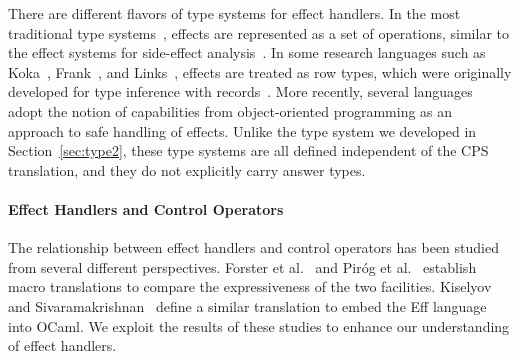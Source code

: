 There are different flavors of type systems for effect handlers.
In the most traditional type systems~\cite{bauer-effsys,kammar-handler},
effects are represented as a set of operations, similar to the effect
systems for side-effect analysis~\cite{nielson-effsys}.
In some research languages such as Koka~\cite{leijen-koka},
Frank~\cite{lindley-frank}, and Links~\cite{hillerstrom-links}, effects are
treated as row types, which were originally developed for type inference
with records~\cite{remy-record}.
More recently, several languages~\cite{zhang-tunnel,brachthauser-lightweight}
adopt the notion of capabilities from object-oriented programming as an
approach to safe handling of effects.
Unlike the type system we developed in Section~\ref{sec:type2}, these type
systems are all defined independent of the CPS translation, and they do not
explicitly carry answer types.


\paragraph{Effect Handlers and Control Operators}

The relationship between effect handlers and control operators has been 
studied from several different perspectives.
Forster et al.~\cite{forster-jfp} and Pir\'og et al.~\cite{pirog-typedeq} 
establish macro translations to compare the expressiveness of the two 
facilities.
Kiselyov and Sivaramakrishnan~\cite{kiselyov-eff} define a similar 
translation to embed the Eff language into OCaml.
We exploit the results of these studies to enhance our understanding of 
effect handlers.
